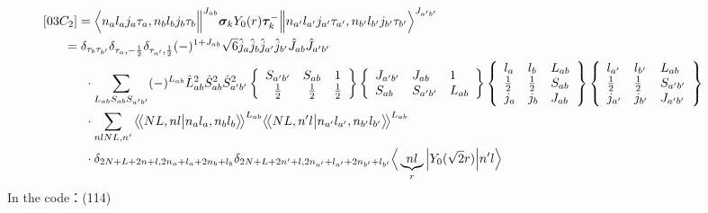 \documentclass[master]{shnuthesis}
\newcommand{\llangle}{\big\langle\!\big\langle}
\newcommand{\rrangle}{\big\rangle\!\big\rangle}
\newcommand{\ap}{a^\prime}
\newcommand{\bp}{b^\prime}
\newcommand{\il}{\!\!\!\!\!\!\!\!\!\!}
\newcommand{\ii}{\!\!\!\!\!\!\!\!\!\!\!\!\!\!\!\!\!\!\!\!}
\begin{document}
\begin{align}
    &\ii [03C_2] = \Big\langle n_a l_a j_a \tau_a, n_b l_b j_b \tau_b \Big\|^{J_{ab}} \bm{\sigma}_k Y_0(r) \bm{\tau}_k^- \Big\| n_{\ap} l_{\ap} j_{\ap} \tau_{\ap}, n_{\bp} l_{\bp} j_{\bp} \tau_{\bp} \Big\rangle^{J_{\ap \bp}} \\
    &\il = \delta_{\tau_b \tau_{\bp}}\delta_{\tau_a, -\frac{1}{2}}\delta_{\tau_{\ap}, \frac{1}{2}} (-)^{1+J_{ab}}\sqrt{6}\hat{j}_a\hat{j}_b\hat{j}_{\ap}\hat{j}_{\bp}\hat{J}_{ab}\hat{J}_{\ap\bp}  \notag\\
    & \cdot \sum_{L_{ab}S_{ab}S_{\ap\bp}} (-)^{L_{ab}} \hat{L}_{ab}^2\hat{S}_{ab}^2\hat{S}_{\ap\bp}^2  \left\{\begin{array}{ccc} S_{\ap\bp} & S_{ab} & 1 \\ \frac{1}{2} & \frac{1}{2} & \frac{1}{2} \end{array}\right\}  \left\{\begin{array}{lll} J_{\ap\bp} & J_{ab} & 1 \\ S_{ab} & S_{\ap\bp} & L_{ab} \end{array}\right\}  \left\{\begin{array}{lll}l_{a} & l_{b} & L_{ab} \\ \frac{1}{2} & \frac{1}{2} & S_{ab} \\j_{a} & j_{b} & J_{ab} \end{array}\right\} \left\{\begin{array}{lll} l_{\ap} & l_{\bp} & L_{ab} \\ \frac{1}{2} & \frac{1}{2} & S_{\ap\bp} \\j_{\ap} & j_{\bp} & J_{\ap\bp} \end{array}\right\}  \notag \\
    & \cdot \sum_{nlNL,n^\prime} \llangle N L, n l \big| n_{a} l_{a}, n_{b} l_{b} \rrangle^{L_{ab}} \llangle N L, n^\prime l \big| n_{a^\prime} l_{a^\prime}, n_{b^\prime} l_{b^\prime} \rrangle^{L_{ab}} \notag\\
    & \cdot \delta_{2N+L+2n+l,2n_a+l_a+2n_b+l_b}\delta_{2N+L+2n^\prime+l,2n_{a^\prime}+l_{a^\prime}+2n_{b^\prime}+l_{b^\prime}} \Big\langle \underbrace{n l}_{r} \Big| Y_0(\sqrt{2}r) \Big| n^\prime l \Big\rangle
\end{align}
In the code：(114)
\end{document}
